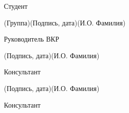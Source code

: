 \documentclass[14pt, russian]{scrartcl}
\begin{document}
\begin{titlepage}
\vspace{\fill}
 

\newlength{\ML}

\noindent Студент \underline{\hspace{1.5cm}} \hfill \underline{\hspace{4cm}}\quad
\underline{\hspace{4cm}}

\vspace{-2.1ex}
\noindent\hspace{9ex}\scriptsize{(Группа)}\normalsize\hspace{170pt}\hspace{2ex}\scriptsize{(Подпись, дата)}\normalsize\hspace{30pt}\hspace{6ex}\scriptsize{(И.О. Фамилия)}\normalsize

\bigskip

\noindent Руководитель ВКР \hfill \underline{\hspace{4cm}}\quad
\underline{\hspace{4cm}}

\vspace{-2ex}
\noindent\hspace{13.5ex}\normalsize\hspace{170pt}\hspace{2ex}\scriptsize{(Подпись, дата)}\normalsize\hspace{30pt}\hspace{6ex}\scriptsize{(И.О. Фамилия)}\normalsize
\bigskip

\noindent Консультант \hfill \underline{\hspace{4cm}}\quad
\underline{\hspace{4cm}}

\vspace{-2ex}
\noindent\hspace{13.5ex}\normalsize\hspace{170pt}\hspace{2ex}\scriptsize{(Подпись, дата)}\normalsize\hspace{30pt}\hspace{6ex}\scriptsize{(И.О. Фамилия)}\normalsize
\bigskip

\noindent Консультант \hfill \underline{\hspace{4cm}}\quad
\underline{\hspace{4cm}}


\end{titlepage}
\end{document}
